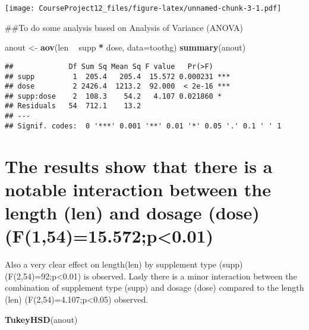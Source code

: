 \documentclass[
]{article}
\newenvironment{Shaded}{\begin{snugshade}}{\end{snugshade}}
\newcommand{\DataTypeTok}[1]{\textcolor[rgb]{0.13,0.29,0.53}{#1}}
\newcommand{\KeywordTok}[1]{\textcolor[rgb]{0.13,0.29,0.53}{\textbf{#1}}}
\newcommand{\NormalTok}[1]{#1}
\newcommand{\OperatorTok}[1]{\textcolor[rgb]{0.81,0.36,0.00}{\textbf{#1}}}
\newcommand{\StringTok}[1]{\textcolor[rgb]{0.31,0.60,0.02}{#1}}
\begin{document}
\texttt{[image: CourseProject12\_files/figure-latex/unnamed-chunk-3-1.pdf]}

\#\#To do some analysis based on Analysis of Variance (ANOVA)

\begin{Shaded}
\begin{Highlighting}[]
\NormalTok{anout <-}\StringTok{ }\KeywordTok{aov}\NormalTok{(len }\OperatorTok{~}\StringTok{ }\NormalTok{supp }\OperatorTok{*}\StringTok{ }\NormalTok{dose, }\DataTypeTok{data=}\NormalTok{toothg)}
\KeywordTok{summary}\NormalTok{(anout)}
\end{Highlighting}
\end{Shaded}

\begin{verbatim}
##             Df Sum Sq Mean Sq F value   Pr(>F)    
## supp         1  205.4   205.4  15.572 0.000231 ***
## dose         2 2426.4  1213.2  92.000  < 2e-16 ***
## supp:dose    2  108.3    54.2   4.107 0.021860 *  
## Residuals   54  712.1    13.2                     
## ---
## Signif. codes:  0 '***' 0.001 '**' 0.01 '*' 0.05 '.' 0.1 ' ' 1
\end{verbatim}

\hypertarget{the-results-show-that-there-is-a-notable-interaction-between-the-length-len-and-dosage-dose-f15415.572p0.01}{%
\section{The results show that there is a notable interaction between
the length (len) and dosage (dose)
(F(1,54)=15.572;p\textless0.01)}\label{the-results-show-that-there-is-a-notable-interaction-between-the-length-len-and-dosage-dose-f15415.572p0.01}}

Also a very clear effect on length(len) by supplement type (supp)
(F(2,54)=92;p\textless0.01) is observed. Lasly there is a minor
interaction between the combination of supplement type (supp) and dosage
(dose) compared to the length (len) (F(2,54)=4.107;p\textless0.05)
observed.

\begin{Shaded}
\begin{Highlighting}[]
\KeywordTok{TukeyHSD}\NormalTok{(anout)}
\end{Highlighting}
\end{Shaded}
\end{document}
